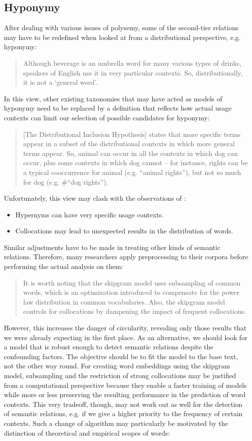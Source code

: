 \documentclass[jou]{apa6} %
\begin{document}
\subsection{Hyponymy}

After dealing with various issues of polysemy, some of the second-tier relations may have to be redefined when looked at from a distributional perspective, e.g. hyponymy:
\blockquote[{\cite[p.~443]{herbelotMeasuringSemanticContent2013}}]{Although beverage is an umbrella word for many various types of drinks, speakers of English use it in very particular contexts. So, distributionally, it is not a ‘general word’.}
In this view, other existing taxonomies that may have acted as models of hyponymy need to be replaced by a definition that reflects how actual usage contexts can limit our selection of possible candidates for hyponymy:
\blockquote[{\cite[p.~443]{rollerInclusiveSelectiveSupervised2014}}]{[The Distributional Inclusion Hypothesis] states that more specific terms appear in a subset of the distributional contexts in which more general terms appear. So, animal can occur in all the contexts in which dog can occur, plus some contexts in which dog cannot – for instance, rights can be a typical cooccurrence for animal (e.g. “animal rights”), but not so much for dog (e.g. \#“dog rights”).}
Unfortunately, this view may clash with the observations of \cite{herbelotMeasuringSemanticContent2013}:
\begin{itemize}
      \item Hypernyms can have very specific usage contexts.
      \item Collocations may lead to unexpected results in the distribution of words.
\end{itemize}
Similar adjustments have to be made in treating other kinds of semantic relations. Therefore, many researchers apply preprocessing to their corpora before performing the actual analysis on them:
\blockquote[{\cite[p.~56f.]{gyllenstenRgramsUnsupervisedLearning2019}}]{It is worth noting that the skipgram model uses subsampling of common words, which is an optimization introduced to compensate for the power law distribution in common vocabularies. Also, the skipgram model controls for collocations by dampening the impact of frequent collocations.}
However, this increases the danger of circularity, revealing only those results that we were already expecting in the first place. As an alternative, we should look for a model that is robust enough to detect semantic relations despite the confounding factors. The objective should be to fit the model to the base text, not the other way round. For creating word embeddings using the skipgram model, subsampling and the restriction of strong collocations may be justified from a computational perspective because they enable a faster training of models while more or less preserving the resulting performance in the prediction of word contexts. This very tradeoff, though, may not work out as well for the detection of semantic relations, e.g. if we give a higher priority to the frequency of certain contexts. Such a change of algorithm may particularly be motivated by the distinction of theoretical and empirical scopes of words:
\end{document}
